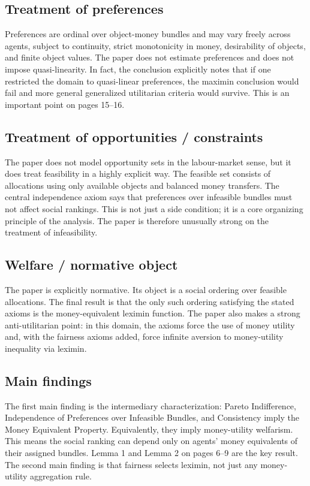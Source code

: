 \documentclass[11pt,a4paper]{article}
\begin{document}
\subsection*{Treatment of preferences}
Preferences are ordinal over object-money bundles and may vary freely across agents, subject to continuity, strict monotonicity in money, desirability of objects, and finite object values. The paper does not estimate preferences and does not impose quasi-linearity. In fact, the conclusion explicitly notes that if one restricted the domain to quasi-linear preferences, the maximin conclusion would fail and more general generalized utilitarian criteria would survive. This is an important point on pages 15–16.

\subsection*{Treatment of opportunities / constraints}
The paper does not model opportunity sets in the labour-market sense, but it does treat feasibility in a highly explicit way. The feasible set consists of allocations using only available objects and balanced money transfers. The central independence axiom says that preferences over infeasible bundles must not affect social rankings. This is not just a side condition; it is a core organizing principle of the analysis. The paper is therefore unusually strong on the treatment of infeasibility.

\subsection*{Welfare / normative object}
The paper is explicitly normative. Its object is a social ordering over feasible allocations. The final result is that the only such ordering satisfying the stated axioms is the money-equivalent leximin function. The paper also makes a strong anti-utilitarian point: in this domain, the axioms force the use of money utility and, with the fairness axioms added, force infinite aversion to money-utility inequality via leximin.

\subsection*{Main findings}
The first main finding is the intermediary characterization: Pareto Indifference, Independence of Preferences over Infeasible Bundles, and Consistency imply the Money Equivalent Property. Equivalently, they imply money-utility welfarism. This means the social ranking can depend only on agents’ money equivalents of their assigned bundles. Lemma 1 and Lemma 2 on pages 6–9 are the key result. The second main finding is that fairness selects leximin, not just any money-utility aggregation rule.
\end{document}
